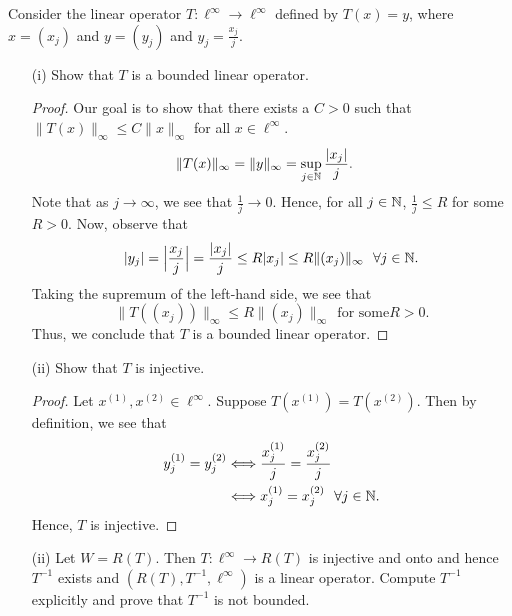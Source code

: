 \documentclass[a4paper]{article}
\begin{document}
\begin{problem}
    Consider the linear operator \( T: \ell^{\infty } \to \ell^{\infty } \) defined by \( T(x) = y  \), where \( x = ({x}_{j}) \) and \( y = ({y}_{j}) \) and \( {y}_{j} = \frac{ {x}_{j} }{ j }  \).
\end{problem}
\begin{enumerate}
    \item[(i)] Show that \( T \) is a bounded linear operator.
        \begin{proof}
            Our goal is to show that there exists a \( C > 0  \) such that \( \|T(x)\|_{\infty } \leq C \|x\|_{\infty } \) for all \( x \in \ell^{\infty } \).
            \begin{align*}
                \|T(x)\|_{\infty } &= \|y\|_{\infty } = \sup_{j \in \mathbb{N}} \frac{ | {x}_{j} | }{ j }.
            \end{align*}
           Note that as \( j \to \infty   \), we see that \( \frac{ 1 }{ j }  \to  0  \). Hence, for all \( j \in \mathbb{N} \), 
           \(  \frac{ 1 }{ j } \leq R  \)
           for some \( R > 0 \). Now, observe that 
           \[  | {y}_{j} | = \Big| \frac{ {x}_{j} }{ j }  \Big|  = \frac{ | {x}_{j} |  }{ j }  \leq R | {x}_{j} | \leq R \|({x}_{j})\|_{\infty } \ \ \forall j \in \mathbb{N}. \]
           Taking the supremum of the left-hand side, we see that 
           \[  \|T(({x}_{j}))\|_{\infty } \leq R \|({x}_{j})\|_{\infty} \ \ \text{for some} R > 0.\]
           Thus, we conclude that \( T  \) is a bounded linear operator.
        \end{proof}
    \item[(ii)] Show that \( T  \) is injective.
        \begin{proof}
        Let \( x^{(1)}, x^{(2)} \in \ell^{\infty } \). Suppose \( T(x^{(1)}) = T(x^{(2)}) \). Then by definition, we see that        
        \begin{align*}
            {y}_{j}^{(1)} = {y}_{j}^{(2)} &\Longleftrightarrow \frac{ {x}_{j}^{(1)} }{ j }  = \frac{ {x}_{j}^{(2)} }{ j }  \\
                                          &\Longleftrightarrow {x}_{j}^{(1)} = {x}_{j}^{(2)} \ \ \forall j \in \mathbb{N}.
        \end{align*}
        Hence, \( T  \) is injective.
        \end{proof}
    \item[(ii)] Let \( W = R(T) \). Then \( T: \ell^{\infty } \to R(T) \) is injective and onto and hence \( T^{-1} \) exists and \( (R(T), T^{-1}, \ell^{\infty }) \) is a linear operator. Compute \( T^{-1} \) explicitly and prove that \( T^{-1} \) is not bounded.

\end{enumerate}
\end{document}
